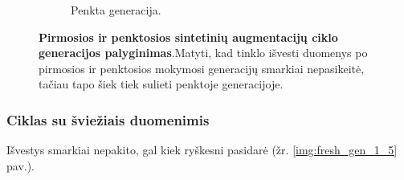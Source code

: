 \documentclass{VUMIFInfKursinis}
\begin{document}
\begin{figure}[H]
\begin{subfigure}[t]{0.45\textwidth}
        \caption{Penkta generacija.}
        \label{img:image2}
    \end{subfigure}
    \caption{\textbf{Pirmosios ir penktosios sintetinių augmentacijų ciklo generacijos palyginimas}.Matyti, kad tinklo išvesti duomenys po pirmosios ir penktosios mokymosi generacijų smarkiai nepasikeitė, tačiau tapo šiek tiek sulieti penktoje generacijoje.}
\label{img:augmentation_gen_1_5}
\end{figure}





\subsubsection{Ciklas su šviežiais duomenimis}
Išvestys smarkiai nepakito, gal kiek ryškesni pasidarė (žr. \ref{img:fresh_gen_1_5} pav.).
\end{document}
